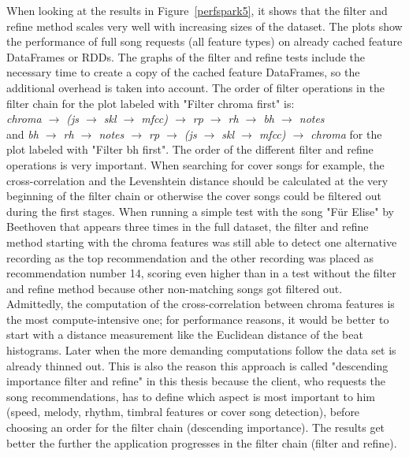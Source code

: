 \noindent When looking at the results in Figure~\ref{perfspark5}, it shows that the filter and refine method scales very well with increasing sizes of the dataset. The plots show the performance of full song requests (all feature types) on already cached feature DataFrames or RDDs. The graphs of the filter and refine tests include the necessary time to create a copy of the cached feature DataFrames, so the additional overhead is taken into account. 
\noindent The order of filter operations in the filter chain for the plot labeled with "Filter chroma first" is:\\
\textit{chroma $\rightarrow$ (js  $\rightarrow$ skl  $\rightarrow$ mfcc) $\rightarrow$ rp  $\rightarrow$ rh  $\rightarrow$ bh  $\rightarrow$ notes}\\ and 
\textit{bh $\rightarrow$ rh $\rightarrow$ notes $\rightarrow$ rp $\rightarrow$ (js  $\rightarrow$ skl  $\rightarrow$ mfcc) $\rightarrow$ chroma} for the plot labeled with "Filter bh first".
\noindent The order of the different filter and refine operations is very important. When searching for cover songs for example, the cross-correlation and the Levenshtein distance should be calculated at the very beginning of the filter chain or otherwise the cover songs could be filtered out during the first stages. When running a simple test with the song "Für Elise" by Beethoven that appears three times in the full dataset, the filter and refine method starting with the chroma features was still able to detect one alternative recording as the top recommendation and the other recording was placed as recommendation number 14, scoring even higher than in a test without the filter and refine method because other non-matching songs got filtered out.\\
Admittedly, the computation of the cross-correlation between chroma features is the most compute-intensive one; for performance reasons, it would be better to start with a distance measurement like the Euclidean distance of the beat histograms. Later when the more demanding computations follow the data set is already thinned out. 
This is also the reason this approach is called "descending importance filter and refine" in this thesis because the client, who requests the song recommendations, has to define which aspect is most important to him (speed, melody, rhythm, timbral features or cover song detection), before choosing an order for the filter chain (descending importance). The results get better the further the application progresses in the filter chain (filter and refine).

